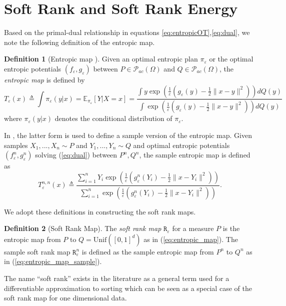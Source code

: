 \documentclass{article}
\theoremstyle{definition}
\newtheorem{definition}{Definition}
\newcommand{\feps}{f_\varepsilon}
\newcommand{\geps}{g_\varepsilon}
\newcommand{\Teps}{T_\varepsilon}
\begin{document}
\section{Soft Rank and Soft Rank Energy}\label{sec:MainDefinitions}
Based on the primal-dual relationship in equations \eqref{eq:entropicOT},\eqref{eq:dual}, we note the following definition of the entropic map.
\begin{definition}[Entropic map \cite{pooladian2021entropic}]\label{def:entropic_map}
Given an optimal entropic plan $\pi_\varepsilon$ or the optimal entropic potentials $(\feps, \geps)$ between $P\in \mathcal{P}_{ac}(\Omega)$ and $Q \in \mathcal{P}_{ac}(\Omega)$, the \emph{entropic map} is defined by
\begin{equation}\label{eq:entropic_map}
    \Teps(x)  \triangleq \displaystyle\int\pi_\varepsilon(y|x) = \mathbb E_{\pi_\varepsilon}[Y|X=x] = \frac{\displaystyle\int y \exp\left(\frac{1}{\varepsilon}\left (\geps(y) - \frac{1}{2}\|x-y\|^2  \right) \right ) dQ(y)}{\displaystyle\int \exp{\left(\frac{1}{\varepsilon}\left (\geps(y) - \frac{1}{2}\|x-y\|^2\right ) \right ) } dQ(y)}
\end{equation}
where $\pi_\varepsilon(y|x)$ denotes the conditional distribution of $\pi_\varepsilon$.
\end{definition}
In \cite{pooladian2021entropic}, the latter form is used to define a sample version of the entropic map. Given samples $X_1,...,X_n \sim P$ and $Y_1,...,Y_n \sim Q$ and optimal entropic potentials $(\feps^n, \geps^n)$ solving (\ref{eq:dual}) between $P^n, Q^n$, the sample entropic map is defined as
\begin{equation}\label{eq:entropic_map_sample}
    \Teps^{n,n}(x)  \triangleq \frac{\displaystyle\sum_{i=1}^n Y_i \exp\left(\frac{1}{\varepsilon}\left (\geps^n(Y_i) - \frac{1}{2}\|x - Y_i\|^2 \right )\right)}{\displaystyle\sum_{i=1}^n \exp\left(\frac{1}{\varepsilon}\left (\geps^n(Y_i) - \frac{1}{2}\|x - Y_i\|^2 \right )\right)}.
\end{equation}

We adopt these definitions in constructing the soft rank maps.
\begin{definition}[Soft Rank Map]\label{def:entropic_rank}
    The \emph{soft rank map} $\mathtt{R}_\varepsilon$ for a measure $P$ is the entropic map from $P$ to $Q = \text{Unif}([0,1]^d)$ as in (\ref{eq:entropic_map}). The sample soft rank map $\mathtt{R}_\varepsilon^n$ is defined as the sample entropic map from $P^n$ to $Q^n$ as in (\ref{eq:entropic_map_sample}).
\end{definition}
The name ``soft rank'' exists in the literature as a general term used  for a differentiable approximation to sorting \cite{taylor2008softrank, blondel2020fast} which can be seen as a special case of the soft rank map for one dimensional data. 
\end{document}
